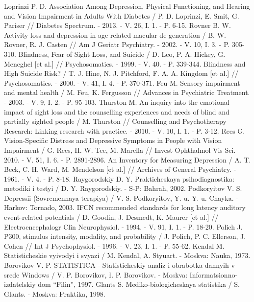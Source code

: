 \documentclass[twocolumn]{article}
\begin{document}
\begin{thebibliography}{35}
Loprinzi P. D. Association Among Depression, Physical Functioning, and Hearing and Vision Impairment in Adults With Diabetes / P. D. Loprinzi, E. Smit, G. Pariser // Diabetes Spectrum. - 2013. - V. 26, I. 1. - P. 6-15.
Rovner B. W. Activity loss and depression in age-related macular de-generation / B. W. Rovner, R. J. Casten  // Am J Geriatr Psychiatry. - 2002. - V. 10, I. 3. - P. 305-310.
Blindness, Fear of Sight Loss, and Suicide / D. Leo, P. A. Hickey, G. Meneghel [et al.] // Psychosomatics. - 1999. - V. 40. - P. 339-344.
Blindness and High Suicide Risk? / T. J. Hine, N. J. Pitchford, F. A. A. Kingdom [et al.] // Psychosomatics. - 2000. - V. 41, I. 4. - P. 370-371.
Feu M. Sensory impairment and mental health / M. Feu, K. Fergusson  // Advances in Psychiatric Treatment. - 2003. - V. 9, I. 2. - P. 95-103.
Thurston M. An inquiry into the emotional impact of sight loss and the counselling experiences and needs of blind and partially sighted people / M. Thurston // Counselling and Psychotherapy Research: Linking research with practice. - 2010. - V. 10, I. 1. - P. 3-12.
Rees G. Vision-Specific Distress and Depressive Symptoms in People with Vision Impairment / G. Rees, H. W. Tee, M. Marella // Invest Ophthalmol Vis Sci. - 2010. - V. 51, I. 6. - P. 2891-2896.
An Inventory for Measuring Depression / A. T. Beck, C. H. Ward, M. Mendelson [et al.] // Archives of General Psychiatry. - 1961. - V. 4. - P. 8-18.
Raygorodskiy D. Y. Prakticheskaya psihodiagnostika: metodiki i testyi / D. Y. Raygorodskiy. - S-P: Bahrah, 2002.
Podkoryitov V. S. Depressii (Sovremennaya terapiya) / V. S. Podkoryitov, Y. u. Y. u. Chayka. - Harkov: Tornado, 2003.
IFCN recommended standards for long latency auditory event-related potentials / D. Goodin, J. Desmedt, K. Maurer [et al.] // Electroencephalogr Clin Neurophysiol. - 1994. - V. 91, I. 1. - P. 18-20.
Polich J. P300, stimulus intensity, modality, and probability / J. Polich, P. C. Ellerson, J. Cohen // Int J Psychophysiol. - 1996. - V. 23, I. 1. - P. 55-62.
Kendal M. Statisticheskie vyivodyi i svyazi / M. Kendal, A. Styuart. - Moskva: Nauka, 1973.
Borovikov V. P. STATISTICA - Statisticheskiy analiz i obrabotka dannyih v srede Windows / V. P. Borovikov, I. P. Borovikov. - Moskva: Informatsionno-izdatelskiy dom “Filin”, 1997.
Glants S. Mediko-biologicheskaya statistika / S. Glants. - Moskva: Praktika, 1998.

\end{thebibliography}
\end{document}
